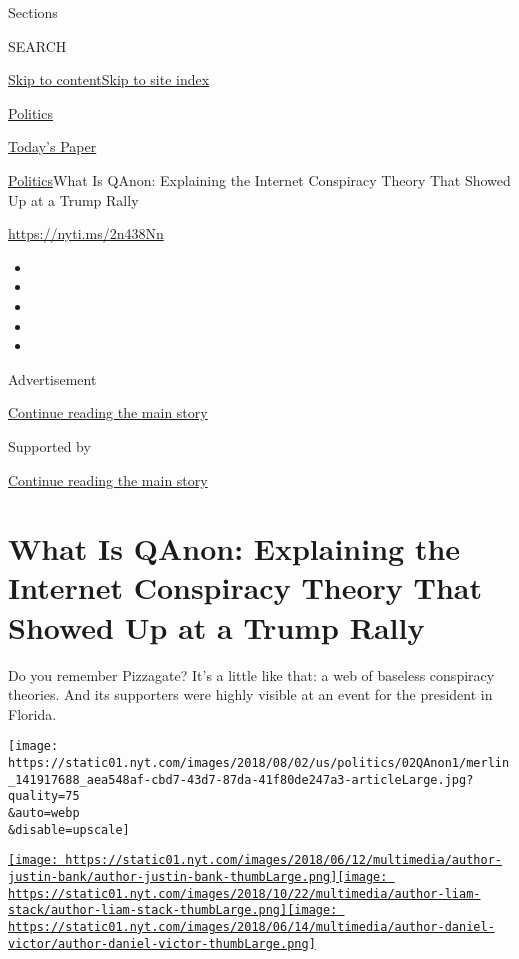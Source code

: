 Sections

SEARCH

\protect\hyperlink{site-content}{Skip to
content}\protect\hyperlink{site-index}{Skip to site index}

\href{https://www.nytimes.com/section/politics}{Politics}

\href{https://myaccount.nytimes.com/auth/login?response_type=cookie\&client_id=vi}{}

\href{https://www.nytimes.com/section/todayspaper}{Today's Paper}

\href{/section/politics}{Politics}\textbar{}What Is QAnon: Explaining
the Internet Conspiracy Theory That Showed Up at a Trump Rally

\url{https://nyti.ms/2n438Nn}

\begin{itemize}
\item
\item
\item
\item
\item
\end{itemize}

Advertisement

\protect\hyperlink{after-top}{Continue reading the main story}

Supported by

\protect\hyperlink{after-sponsor}{Continue reading the main story}

\hypertarget{what-is-qanon-explaining-the-internet-conspiracy-theory-that-showed-up-at-a-trump-rally}{%
\section{What Is QAnon: Explaining the Internet Conspiracy Theory That
Showed Up at a Trump
Rally}\label{what-is-qanon-explaining-the-internet-conspiracy-theory-that-showed-up-at-a-trump-rally}}

Do you remember Pizzagate? It's a little like that: a web of baseless
conspiracy theories. And its supporters were highly visible at an event
for the president in Florida.

\texttt{[image: https://static01.nyt.com/images/2018/08/02/us/politics/02QAnon1/merlin\_141917688\_aea548af-cbd7-43d7-87da-41f80de247a3-articleLarge.jpg?quality=75\\\&auto=webp\\\&disable=upscale]}

\href{https://www.nytimes.com/by/justin-bank}{\texttt{[image: https://static01.nyt.com/images/2018/06/12/multimedia/author-justin-bank/author-justin-bank-thumbLarge.png]}}\href{https://www.nytimes.com/by/liam-stack}{\texttt{[image: https://static01.nyt.com/images/2018/10/22/multimedia/author-liam-stack/author-liam-stack-thumbLarge.png]}}\href{https://www.nytimes.com/by/daniel-victor}{\texttt{[image: https://static01.nyt.com/images/2018/06/14/multimedia/author-daniel-victor/author-daniel-victor-thumbLarge.png]}}


